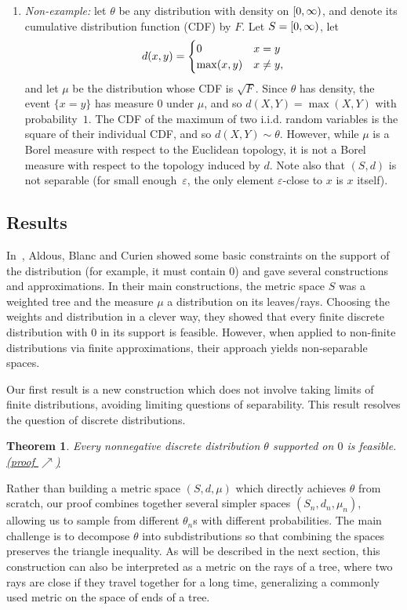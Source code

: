 \documentclass[10pt]{amsart}
\newtheorem{theo}{Theorem}[section]
\theoremstyle{definition}\newtheorem{defi}[theo]{Definition}\newtheorem{rema}[theo]{Remark}\newtheorem{exam}[theo]{Example}\newtheorem{exem}[theo]{Example}\newtheorem{nota}[theo]{Notation}
\newcommand*\eps{\varepsilon}
\newcommand*\nonnegative{\left[0,\infty\right)}
\let\originalleft\left
\let\originalright\right
\renewcommand{\left}{\mathopen{}\mathclose\bgroup\originalleft}
\renewcommand{\right}{\aftergroup\egroup\originalright}
\begin{document}
\begin{enumerate}
\item \emph{Non-example:} let $\theta$ be any distribution with density on $\nonnegative$, and denote its cumulative distribution function (CDF) by $F$. Let $S=\nonnegative$, let
\[
d\left(x,y\right)=
\begin{cases}
0 & x=y\\
\max\left(x,y\right) & x\neq y,
\end{cases}
\]
and let $\mu$ be the distribution whose CDF is $\sqrt{F}$. Since $\theta$ has density, the event $\{ x=y\} $ has measure $0$ under $\mu$, and so $d(X,Y)=\max(X,Y)$ with probability~$1$. The CDF of the maximum of two i.i.d. random variables is the square of their individual CDF, and so $d(X,Y)\sim\theta$. However, while $\mu$ is a Borel measure with respect to the Euclidean topology, it is not a Borel measure with respect to the topology induced by $d$. Note also that $(S,d)$ is not separable (for small enough~$\eps$, the only element $\eps$-close to $x$ is $x$ itself).
\end{enumerate}

\subsection{Results}

In~\cite{aldous_blanc_curien_distance_problem_2024}, Aldous, Blanc and Curien showed some basic constraints on the support of the distribution (for example, it must contain $0$) and gave several constructions and approximations. In their main constructions, the metric space $S$ was a weighted tree and the measure $\mu$ a distribution on its leaves/rays. Choosing the weights and distribution in a clever way, they showed that every finite discrete distribution with $0$ in its support is feasible. However, when applied to non-finite distributions via finite approximations, their approach yields non-separable spaces.

Our first result is a new construction which does not involve taking limits of finite distributions, avoiding limiting questions of separability. This result resolves the question of discrete distributions.

\begin{theo}\label{thm:discrete_distributions}
Every nonnegative discrete distribution $\theta$ supported on $0$ is feasible. \hyperlink{target:proof_of_discrete}{({proof $\nearrow$})}%
\end{theo}

Rather than building a metric space $(S,d,\mu)$ which directly achieves $\theta$ from scratch, our proof combines together several simpler spaces $(S_{n},d_{n},\mu_{n})$, allowing us to sample from different $\theta_{n}$s with different probabilities. The main challenge is to decompose $\theta$ into subdistributions so that combining the spaces preserves the triangle inequality. As will be described in the next section, this construction can also be interpreted as a metric on the rays of a tree, where two rays are close if they travel together for a long time, generalizing a commonly used metric on the space of ends of a tree.
\end{document}
